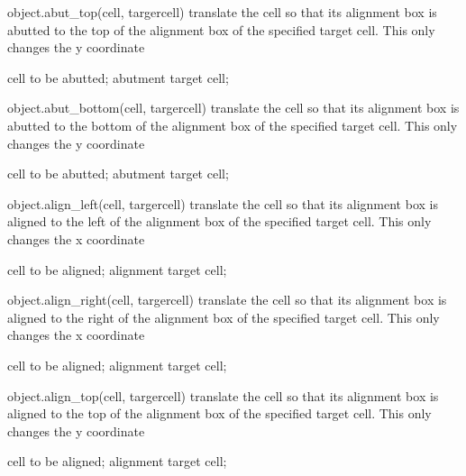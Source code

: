 \begin{APIfunc}{object.abut\_top(cell, targercell)}
    translate the cell so that its alignment box is abutted to the top of the alignment box of the specified target cell. This only changes the y coordinate
    \begin{APIparameters}
            cell to be abutted;
            abutment target cell;
    \end{APIparameters}
\end{APIfunc}
\begin{APIfunc}{object.abut\_bottom(cell, targercell)}
    translate the cell so that its alignment box is abutted to the bottom of the alignment box of the specified target cell. This only changes the y coordinate
    \begin{APIparameters}
            cell to be abutted;
            abutment target cell;
    \end{APIparameters}
\end{APIfunc}
\begin{APIfunc}{object.align\_left(cell, targercell)}
    translate the cell so that its alignment box is aligned to the left of the alignment box of the specified target cell. This only changes the x coordinate
    \begin{APIparameters}
            cell to be aligned;
            alignment target cell;
    \end{APIparameters}
\end{APIfunc}
\begin{APIfunc}{object.align\_right(cell, targercell)}
    translate the cell so that its alignment box is aligned to the right of the alignment box of the specified target cell. This only changes the x coordinate
    \begin{APIparameters}
            cell to be aligned;
            alignment target cell;
    \end{APIparameters}
\end{APIfunc}
\begin{APIfunc}{object.align\_top(cell, targercell)}
    translate the cell so that its alignment box is aligned to the top of the alignment box of the specified target cell. This only changes the y coordinate
    \begin{APIparameters}
            cell to be aligned;
            alignment target cell;
    \end{APIparameters}
\end{APIfunc}
